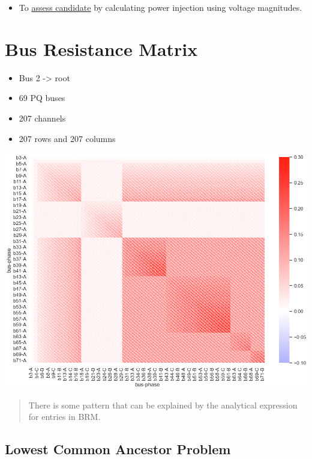 \documentclass[
]{book}
\providecommand{\tightlist}{%
  \setlength{\itemsep}{0pt}\setlength{\parskip}{0pt}}
\begin{document}
\begin{itemize}
\tightlist
\item
  To \protect\hyperlink{assessment}{assess candidate} by calculating power injection using
  voltage magnitudes.
\end{itemize}

\hypertarget{BRM}{%
\section{Bus Resistance Matrix}\label{BRM}}

\begin{itemize}
\tightlist
\item
  Bus 2 -\textgreater{} root
\item
  69 PQ buses
\item
  207 channels
\item
  207 rows and 207 columns
\end{itemize}

\begin{center}\includegraphics{Pictures/figHeatmapBRM} \end{center}

\begin{quote}
There is some pattern that can be explained by the analytical expression for
entries in BRM.
\end{quote}

\hypertarget{LCA}{%
\subsection*{Lowest Common Ancestor Problem}\label{LCA}}
\end{document}
